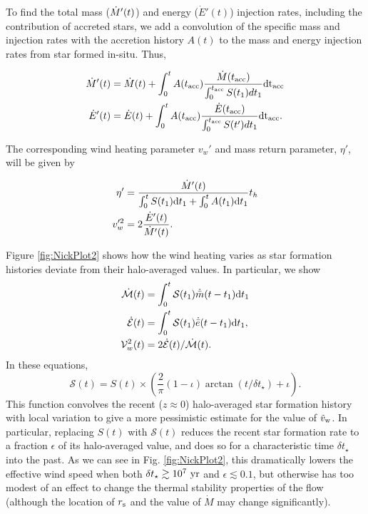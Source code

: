   To find the total mass ($\dot{M}'(t)$) and energy ($\dot{E}'(t)$)
  injection rates, including the contribution of accreted stars, we
  add a convolution of the specific mass and injection rates with the
  accretion history $A(t)$ to the mass and energy injection rates from
  star formed in-situ.  Thus,

\begin{align}
\dot{M} '(t)&=\dot{M}(t)+\int_{0}^{t} A(t_{\rm acc}) \frac{\dot{M}(t_{\rm acc})}
{\int_{0}^{t_{\rm acc}} S(t_1) dt_1} {\rm dt_{ acc}}\\
\dot{E}'(t)&=\dot{E}(t)+\int_{0}^{t} A(t_{\rm acc}) \frac{\dot{E}(t_{\rm acc})}
{\int_{0}^{t_{\rm acc}} S(t') dt_1} {\rm dt_{acc}}.
\end{align}

The corresponding wind heating parameter $v_w'$ and mass return
parameter, $\eta'$, will be given by

\begin{align}
\eta'&=\frac{\dot{M}'(t)}{\int_0^t S(t_1) {\rm d}t_1+\int_0^t A(t_1) {\rm
    d}t_1} t_h\\
v_w'^2&=2 \frac{\dot{E}'(t)}{\dot{M}'(t)}.
\end{align}

Figure \ref{fig:NickPlot2} shows how the wind heating varies as star formation histories deviate from their halo-averaged values.  In particular, we show
\begin{align} 
  \dot{\mathcal{M}}(t) &= \int_0^t \mathcal{S}(t_1) \dot{\bar{m}}(t-t_1){\rm
      d}t_1\\
  \dot{\mathcal{E}}(t) &= \int_0^t \mathcal{S}(t_1) \dot{\bar{e}}(t-t_1){\rm
      d}t_1,\\
  \mathcal{V}_w^2(t) &=2 \dot{\mathcal{E}}(t)/\dot{\mathcal{M}}(t).
\end{align}
In these equations, 
\begin{equation}
\mathcal{S}(t) = S(t) \times
\left(\frac{2}{\pi}(1-\iota)\arctan(t/\delta t_{\star}) + \iota
\right).
\label{eq:sfrPerturbed}
\end{equation}
This function convolves the recent ($z \approx 0$) halo-averaged star
formation history with local variation to give a more pessimistic
estimate for the value of $\tilde{v}_{\rm w}$.  In particular,
replacing $S(t)$ with $\mathcal{S}(t)$ reduces the recent star
formation rate to a fraction $\epsilon$ of its halo-averaged value,
and does so for a characteristic time $\delta t_{\star}$ into the
past.  As we can see in Fig. \ref{fig:NickPlot2}, this dramatically
lowers the effective wind speed when both $\delta t_{\star} \gtrsim
10^7 ~{\rm yr}$ and $\epsilon \lesssim 0.1$, but otherwise has too
modest of an effect to change the thermal stability properties of the
flow (although the location of $r_{\rm s}$ and the value of $\dot{M}$
may change significantly).


